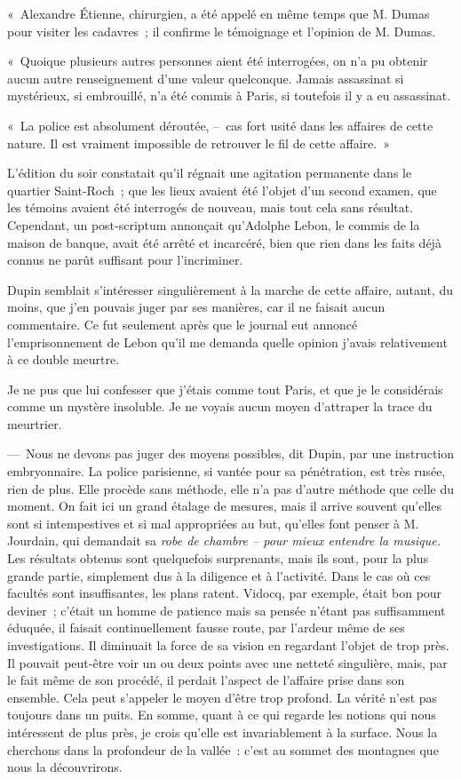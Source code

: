 \documentclass[french,twoside]{book} %
\begin{document}
« Alexandre Étienne, chirurgien, a été appelé en même temps que M. Dumas pour visiter les cadavres ; il confirme le témoignage et l’opinion de M. Dumas.\par
« Quoique plusieurs autres personnes aient été interrogées, on n’a pu obtenir aucun autre renseignement d’une valeur quelconque. Jamais assassinat si mystérieux, si embrouillé, n’a été commis à Paris, si toutefois il y a eu assassinat.\par
« La police est absolument déroutée, – cas fort usité dans les affaires de cette nature. Il est vraiment impossible de retrouver le fil de cette affaire. »\par
L’édition du soir constatait qu’il régnait une agitation permanente dans le quartier Saint-Roch ; que les lieux avaient été l’objet d’un second examen, que les témoins avaient été interrogés de nouveau, mais tout cela sans résultat. Cependant, un post-scriptum annonçait qu’Adolphe Lebon, le commis de la maison de banque, avait été arrêté et incarcéré, bien que rien dans les faits déjà connus ne parût suffisant pour l’incriminer.\par
Dupin semblait s’intéresser singulièrement à la marche de cette affaire, autant, du moins, que j’en pouvais juger par ses manières, car il ne faisait aucun commentaire. Ce fut seulement après que le journal eut annoncé l’emprisonnement de Lebon qu’il me demanda quelle opinion j’avais relativement à ce double meurtre.\par
Je ne pus que lui confesser que j’étais comme tout Paris, et que je le considérais comme un mystère insoluble. Je ne voyais aucun moyen d’attraper la trace du meurtrier.\par
— Nous ne devons pas juger des moyens possibles, dit Dupin, par une instruction embryonnaire. La police parisienne, si vantée pour sa pénétration, est très rusée, rien de plus. Elle procède sans méthode, elle n’a pas d’autre méthode que celle du moment. On fait ici un grand étalage de mesures, mais il arrive souvent qu’elles sont si intempestives et si mal appropriées au but, qu’elles font penser à M. Jourdain, qui demandait sa \emph{robe de chambre – pour mieux entendre la musique.} Les résultats obtenus sont quelquefois surprenants, mais ils sont, pour la plus grande partie, simplement dus à la diligence et à l’activité. Dans le cas où ces facultés sont insuffisantes, les plans ratent. Vidocq, par exemple, était bon pour deviner ; c’était un homme de patience mais sa pensée n’étant pas suffisamment éduquée, il faisait continuellement fausse route, par l’ardeur même de ses investigations. Il diminuait la force de sa vision en regardant l’objet de trop près. Il pouvait peut-être voir un ou deux points avec une netteté singulière, mais, par le fait même de son procédé, il perdait l’aspect de l’affaire prise dans son ensemble. Cela peut s’appeler le moyen d’être trop profond. La vérité n’est pas toujours dans un puits. En somme, quant à ce qui regarde les notions qui nous intéressent de plus près, je crois qu’elle est invariablement à la surface. Nous la cherchons dans la profondeur de la vallée : c’est au sommet des montagnes que nous la découvrirons.\par
\end{document}
